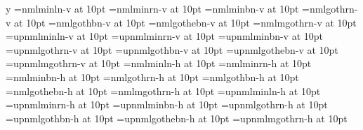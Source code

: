 \if y\USEOTF
\ifx\MAPSETja\undefined\else\shipout\vbox{\DIR\ADJUST
  \iftdir
    \ifx\ucs\undefined
      \tfont\x=nmlminln-v at 10pt\x\TESTJP
      \tfont\x=nmlminrn-v at 10pt\x\TESTJP
      \tfont\x=nmlminbn-v at 10pt\x\TESTJP
      \tfont\x=nmlgothrn-v at 10pt\x\TESTJP
      \tfont\x=nmlgothbn-v at 10pt\x\TESTJP
      \tfont\x=nmlgothebn-v at 10pt\x\TESTJP
      \tfont\x=nmlmgothrn-v at 10pt\x\TESTJP
    \else
      \tfont\x=upnmlminln-v at 10pt\x\TESTJP
      \tfont\x=upnmlminrn-v at 10pt\x\TESTJP
      \tfont\x=upnmlminbn-v at 10pt\x\TESTJP
      \tfont\x=upnmlgothrn-v at 10pt\x\TESTJP
      \tfont\x=upnmlgothbn-v at 10pt\x\TESTJP
      \tfont\x=upnmlgothebn-v at 10pt\x\TESTJP
      \tfont\x=upnmlmgothrn-v at 10pt\x\TESTJP
    \fi
  \else
    \ifx\ucs\undefined
      \tfont\x=nmlminln-h at 10pt\x\TESTJP
      \tfont\x=nmlminrn-h at 10pt\x\TESTJP
      \tfont\x=nmlminbn-h at 10pt\x\TESTJP
      \tfont\x=nmlgothrn-h at 10pt\x\TESTJP
      \tfont\x=nmlgothbn-h at 10pt\x\TESTJP
      \tfont\x=nmlgothebn-h at 10pt\x\TESTJP
      \tfont\x=nmlmgothrn-h at 10pt\x\TESTJP
    \else
      \tfont\x=upnmlminln-h at 10pt\x\TESTJP
      \tfont\x=upnmlminrn-h at 10pt\x\TESTJP
      \tfont\x=upnmlminbn-h at 10pt\x\TESTJP
      \tfont\x=upnmlgothrn-h at 10pt\x\TESTJP
      \tfont\x=upnmlgothbn-h at 10pt\x\TESTJP
      \tfont\x=upnmlgothebn-h at 10pt\x\TESTJP
      \tfont\x=upnmlmgothrn-h at 10pt\x\TESTJP
    \fi
  \fi
}\fi
\fi

\bye
